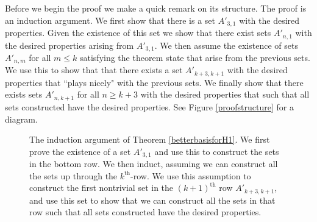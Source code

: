 \documentclass[12py]{amsart}%
\theoremstyle{definition}\newtheorem{definition}[thm]{Definition}
\theoremstyle{definition}
\begin{document}
Before we begin the proof we make a quick remark on its structure. The proof is an induction argument. We first show that there is a set $A'_{3,1}$ with the desired properties. Given the existence of this set we show that there exist sets $A'_{n,1}$ with the desired properties arising from $A'_{3,1}$. We then assume the existence of sets $A'_{n,m}$ for all $m\le k$ satisfying the theorem state that arise from the previous sets. We use this to show that that there exists a set $A'_{k+3,k+1}$ with the desired properties that ``plays nicely" with the previous sets. We finally show that there exists sets $A'_{n,k+1}$ for all $n\ge k+3$ with the desired properties that such that all sets constructed have the desired properties. See Figure \ref{proofstructure} for a diagram.

\begin{figure}[H]\label{proofstructure}
\centering
{}
\caption{The induction argument of Theorem \ref{betterbasisforH1}. We first prove the existence of a set $A'_{3,1}$ and use this to construct the sets in the bottom row. We then induct, assuming we can construct all the sets up through the $k^{\text{th}}$-row. We use this assumption to construct the first nontrivial set in the $(k+1)^{\text{th}}$ row $A'_{k+3,k+1}$, and use this set to show that we can construct all the sets in that row such that all sets constructed have the desired properties.}
\label{e2n8}
\end{figure}
\end{document}
